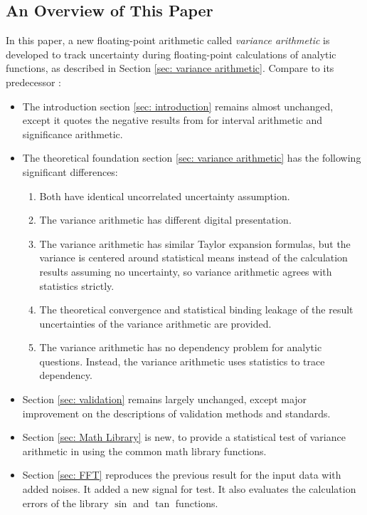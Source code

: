 \documentclass[twoside]{article}
\numberwithin{equation}{section}
\begin{document}
\subsection{ An Overview of This Paper}

In this paper, a new floating-point arithmetic called \emph{variance arithmetic} is developed to track uncertainty during floating-point calculations of analytic functions, as described in Section \ref{sec: variance arithmetic}. 
Compare to its predecessor \cite{Prev_Precision_Arithmetic}:
 \begin{itemize}
\item The introduction section \ref{sec: introduction} remains almost unchanged, except it quotes the negative results from \cite{Prev_Precision_Arithmetic} for interval arithmetic and significance arithmetic.

\item The theoretical foundation section \ref{sec: variance arithmetic} has the following significant differences:

\begin{enumerate}
\item Both have identical uncorrelated uncertainty assumption.

\item The variance arithmetic has different digital presentation.

\item The variance arithmetic has similar Taylor expansion formulas, but the variance is centered around statistical means instead of the calculation results assuming no uncertainty, so variance arithmetic agrees with statistics strictly.

\item The theoretical  convergence and statistical binding leakage of the result uncertainties of the variance arithmetic are provided.

\item The variance arithmetic has no dependency problem for analytic questions.
Instead, the variance arithmetic uses statistics to trace dependency.
\end{enumerate}

\item Section \ref{sec: validation} remains largely unchanged, except major improvement on the descriptions of validation methods and standards.

\item Section \ref{sec: Math Library} is new, to provide a statistical test of variance arithmetic in using the common math library functions.

\item Section \ref{sec: FFT} reproduces the previous result for the input data with added noises.  
It added a new signal for test.
It also evaluates the calculation errors of the library $\sin$ and $\tan$ functions.

\end{itemize}
\end{document}
